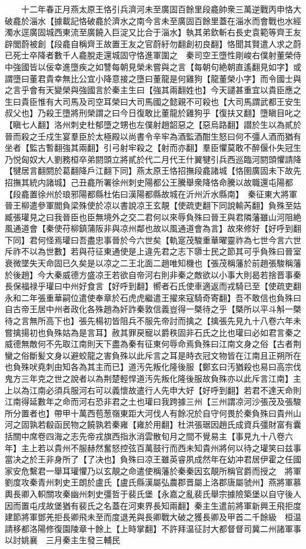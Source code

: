 　　十二年春正月燕太原王恪引兵濟河未至廣固百餘里段龕帥衆三萬逆戰丙申恪大破龕於淄水【據載記恪破龕於濟水之南今言未至廣固百餘里蓋在淄水而會戰也水經濁水逕廣固城西東流至廣饒入巨淀又比合于淄水】執其弟欽斬右長史袁範等齊王友辟閭蔚被創【段龕自稱齊王故置王友之官蔚紆勿翻創初良翻】恪聞其賢遣人求之蔚已死士卒降者數千人龕脫走還城固守恪進軍圍之　秦司空王墮性剛峻右僕射董榮侍中強國皆以佞幸進墮疾之如讐每朝見榮未嘗與之言【每朝句絶朝直遙翻見如字】或謂墮曰董君貴幸無比公宜小降意接之墮曰董龍是何雞狗【龍董榮小字】而令國士與之言乎會有天變榮與強國言於秦主生曰【強其兩翻姓也】今天譴甚重宜以貴臣應之生曰貴臣惟有大司馬及司空耳榮曰大司馬國之懿親不可殺也【大司馬謂武都王安生叔父也】乃殺王墮將刑榮謂之曰今日復敢比董龍於雞狗乎【復扶又翻】墮瞋目叱之【瞋七人翻】洛州刺史杜郁墮之甥也左僕射趙韶惡之【惡烏路翻】譛於生以為貳於晉而殺之壬戍生宴羣臣於太極殿以尚書令辛牢為酒監酒酣生怒曰何不彊人酒而猶有坐者【監古暫翻強其兩翻】引弓射牢殺之【射而亦翻】羣臣懼莫敢不醉偃仆失冠生乃悦匈奴大人劉務桓卒弟閼頭立將貳於代二月代王什翼犍引兵西巡臨河閼頭懼請降【犍居言翻閼於葛翻降戶江翻下同】燕太原王恪招撫段龕諸城【恪圉廣固未下故先招撫其統内諸城】己丑龕所署徐州刺史陽都公王騰舉衆降恪命騰以故職還屯陽都【段龕置徐州於琅邪陽都縣杜佑曰漢陽都縣故城在沂州沂水縣南】　秦征東大將軍晉王柳遣參軍閻負梁殊使於凉以書說凉王玄靚【使疏吏翻下同說輸芮翻】負殊至姑臧張瓘見之曰我晉臣也臣無境外之交二君何以來辱負殊曰晉王與君隣藩雖山河阻絶風通道會【秦使苻柳鎮蒲阪非與凉州鄰也故以風通道會為言】故來修好【好呼到翻下同】君何怪焉瓘曰吾盡忠事晉於今六世矣【軌寔茂駿重華曜靈祚為七世今言六世斥祚不以為世數】若與苻征東通使是上違先君之志下隳士民之節其可乎負殊曰晉室衰微墜失天命固已久矣是以凉之二王北面二趙唯知機也【張茂稱藩於前趙張駿稱藩於後趙】今大秦威德方盛凉王若欲自帝河右則非秦之敵欲以小事大則曷若捨晋事秦長保福禄乎瓘曰中州好食言【好呼到翻】嚮者石氏使車適返而戎騎已至【使疏吏翻永和二年張重華嗣位遣使奉章於石虎虎繼遣王擢來寇騎奇寄翻】吾不敢信也負殊曰自古帝王居中州者政化各殊趙為奸詐秦敦信義豈得一槩待之乎【槩所以平斗斛一槩待之言無所高下也】張先楊初皆阻兵不服先帝討而擒之【擒張先見九十八卷六年未嘗擒揚初也負殊姑為是言耳】赦其罪戻寵以爵秩固非石氏之比也瓘曰必如君言秦之威德無敵何不先取江南則天下盡為秦有征東何辱命焉負殊曰江南文身之俗【古者荆蠻之俗斷髪文身以避蛟龍之害負殊以此斥言之耳是時衣冠文物皆在江南且正朔所在也負殊吠堯刺由知各為其主而已】道汚先叛化隆後服【鄭玄曰汚猶殺也易曰高宗伐鬼方三年克之世之說者以為荆楚輕悍道汚先叛化隆後服故負殊亦以此斥言江南】主上以為江南必須兵服河右可以義懷故遣行人先申大好【好呼到翻】若君不達天命則江南得延數年之命而河右恐非君之土也瓘曰我跨據三州【三州謂凉河沙張茂及張駿所分置者也】帶甲十萬西苞葱嶺東距大河伐人有餘况於自守何畏於秦負殊曰貴州山河之固孰若殽函民物之饒孰若秦雍【雍於用翻】杜洪張琚因趙氏成資兵彊財富有囊括關中席卷四海之志先帝戎旗西指氷消雲散旬月之間不覺易主【事見九十八卷六年】主上若以貴州不服赫然奮怒控弦百萬鼓行而西未知貴州將何以待之瓘笑曰兹事當决之於王非身所了【了决也】負殊曰凉王雖英睿夙成然年在幼冲君居伊霍之任國家安危繫君一舉耳瓘懼乃以玄靚之命遣使稱藩於秦秦因玄靚所稱官爵而授之　將軍劉度攻秦青州刺史王朗於盧氏【盧氏縣漢屬弘農郡晋屬上洛郡唐屬虢州】燕將軍慕輿長卿入軹關攻秦幽州刺史彊哲于裴氏堡【永嘉之亂裴氏舉宗據險築堡以自守後人因而置屯戌故堡猶有裴氏之名蓋在河東界長知兩翻】秦主生遣前將軍新興王飛拒度建節將軍鄧羌拒長卿飛未至而度退羌與長卿戰大破之獲長卿及甲首二千餘級　桓温請移都洛陽修復園陵章十餘上【上時掌翻】不許拜温征討大都督督司冀二州諸軍事以討姚襄　三月秦主生發三輔民